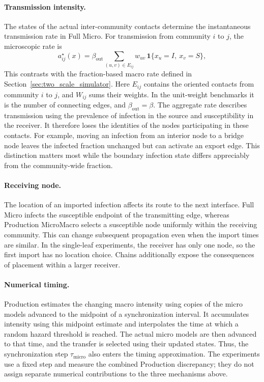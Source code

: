 \documentclass[a4paper,fleqn]{cas-sc}
\begin{document}
\paragraph{Transmission intensity.}
The states of the actual inter-community contacts determine the instantaneous transmission rate in Full Micro. For transmission from community $i$ to $j$, the microscopic rate is
\begin{equation}
\label{eq:true_inter_intensity_error}
a^\star_{ij}(x)
=\beta_{\mathrm{out}}
\sum_{(u,v)\in E_{ij}}w_{uv}\,
\mathbf{1}\{x_u=I,\ x_v=S\},
\end{equation}
This contrasts with the fraction-based macro rate defined in Section~\ref{sec:two_scale_simulator}.
Here $E_{ij}$ contains the oriented contacts from community $i$ to $j$, and $W_{ij}$ sums their weights. In the unit-weight benchmarks it is the number of connecting edges, and $\beta_{\mathrm{out}}=\beta$. The aggregate rate describes transmission using the prevalence of infection in the source and susceptibility in the receiver. It therefore loses the identities of the nodes participating in these contacts. For example, moving an infection from an interior node to a bridge node leaves the infected fraction unchanged but can activate an export edge. This distinction matters most while the boundary infection state differs appreciably from the community-wide fraction.

\paragraph{Receiving node.}
The location of an imported infection affects its route to the next interface. Full Micro infects the susceptible endpoint of the transmitting edge, whereas Production MicroMacro selects a susceptible node uniformly within the receiving community. This can change subsequent propagation even when the import times are similar. In the single-leaf experiments, the receiver has only one node, so the first import has no location choice. Chains additionally expose the consequences of placement within a larger receiver.

\paragraph{Numerical timing.}
Production estimates the changing macro intensity using copies of the micro models advanced to the midpoint of a synchronization interval. It accumulates intensity using this midpoint estimate and interpolates the time at which a random hazard threshold is reached. The actual micro models are then advanced to that time, and the transfer is selected using their updated states. Thus, the synchronization step $\tau_{\mathrm{micro}}$ also enters the timing approximation. The experiments use a fixed step and measure the combined Production discrepancy; they do not assign separate numerical contributions to the three mechanisms above.
\end{document}
